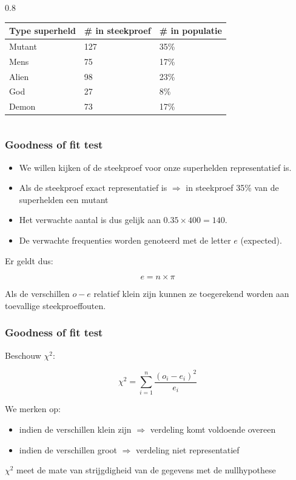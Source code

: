 \documentclass{beamer}
\begin{document}
\begin{frame}
\begin{columns}
    \begin{column} { 0.8 \textwidth}
    \begin{table}[h]
\begin{tabular}{@{}lll@{}}
\toprule
\textbf{Type superheld} & \textbf{\# in steekproef} & \textbf{\# in populatie} \\ \midrule
Mutant                  & 127                       & 35\%                     \\
Mens                    & 75                        & 17\%                     \\
Alien                   & 98                        & 23\%                     \\
God                     & 27                        & 8\%                     \\
Demon                   & 73                        & 17\%                      \\ \bottomrule
\end{tabular}
\end{table}
    \end{column}
  \end{columns}
\end{frame}

\begin{frame}
  \frametitle{Goodness of fit test}
\begin{itemize}
  \item We willen kijken of de steekproef voor onze superhelden representatief is.
  \item Als de steekproef exact representatief is $\Rightarrow$ in steekproef 35\% van de superhelden een mutant
  \item Het verwachte aantal is dus gelijk aan $0.35 \times 400 = 140$.
  \item De verwachte frequenties worden genoteerd met de letter $e$ (expected).
\end{itemize}
 Er geldt dus:

\[ e = n \times \pi \]

Als de verschillen $o - e$  relatief klein zijn kunnen ze toegerekend worden aan toevallige steekproeffouten.
\end{frame}

\begin{frame}
  \frametitle{Goodness of fit test}
  Beschouw $\chi^{2}$:

\[ \chi^{2} = \sum_{i=1}^{n} \frac{(o_{i} - e_{i})^{2}}{e_{i}} \]

We merken op:
\begin{itemize}
  \item indien de verschillen klein zijn $\Rightarrow$ verdeling komt voldoende overeen
  \item indien de verschillen groot $\Rightarrow$ verdeling niet representatief
\end{itemize}

$\chi^{2}$ meet de mate van strijgdigheid van de gegevens met de nullhypothese
\end{frame}
\end{document}
